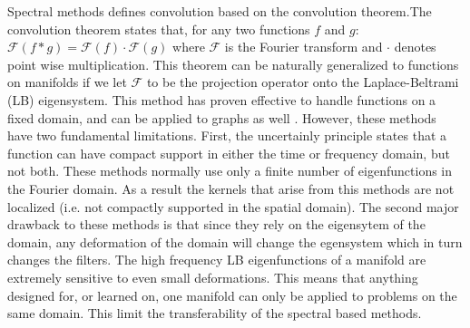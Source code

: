 \documentclass[10pt,twocolumn,letterpaper]{article}
\def\F{\mathcal{F}}
\begin{document}
Spectral methods defines convolution based on the convolution theorem.The convolution theorem states that, for any two functions $f$ and $g$: $\F (f * g) = \F(f)\cdot \F(g)$
where $\F$ is the Fourier transform and $\cdot$ denotes point wise multiplication. This theorem can be naturally generalized to functions on manifolds if we let $\F$ to be the projection operator onto the Laplace-Beltrami (LB) eigensystem. This method has proven effective to handle functions on a fixed domain, and can be applied to graphs as well \cite{hammond2011wavelets,bruna2013spectral,dong2015sparse,henaff2015deep}. However, these methods have two fundamental limitations. First, the uncertainly principle states that a function can have compact support in either the time or frequency domain, but not both. These methods normally use only a finite number of eigenfunctions in the Fourier domain. As a result the kernels that arise from this methods are not localized (i.e. not compactly supported in the spatial domain). The second major drawback to these methods is that since they rely on the eigensytem of the domain, any deformation of the domain will change the egensystem which in turn changes the filters. The high frequency LB eigenfunctions of a manifold are extremely sensitive to even small deformations. This means that anything designed for, or learned on, one manifold can only be applied to problems on the same domain. This limit the transferability of the spectral based methods.
\end{document}
